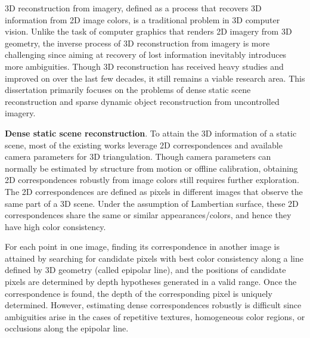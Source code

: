3D reconstruction from imagery, defined as a process that recovers 3D information from 2D image colors, is a traditional problem in 3D computer vision.
Unlike the task of computer graphics that renders 2D imagery from 3D geometry, the inverse process of 3D reconstruction from imagery is more challenging since aiming at recovery of lost information inevitably introduces more ambiguities. Though 3D reconstruction has received heavy studies and improved on over the last few decades, it still remains a viable research area. 
This dissertation primarily focuses on the problems of dense static scene reconstruction and sparse dynamic object reconstruction from uncontrolled imagery.

\textbf{Dense static scene reconstruction}.
To attain the 3D information of a static scene, most of the existing works leverage 2D correspondences and available camera parameters for 3D triangulation. Though camera parameters can normally be estimated by structure from motion or offline calibration, obtaining 2D correspondences robustly from image colors still requires further exploration. The 2D correspondences are defined as pixels in different images that observe the same part of a 3D scene. Under the assumption of Lambertian surface, these 2D correspondences share the same or similar appearances/colors, and hence they have high color consistency.

For each point in one image, finding its correspondence in another image is attained by searching for candidate pixels with best color consistency along a line defined by 3D geometry (called epipolar line), and the positions of candidate pixels are determined by depth hypotheses generated in a valid range. Once the correspondence is found, the depth of the corresponding pixel is uniquely determined. However, estimating dense correspondences robustly is difficult since ambiguities arise in the cases of repetitive textures, homogeneous color regions, or occlusions along the epipolar line. 


